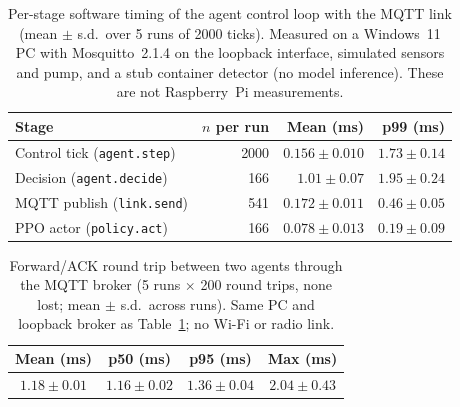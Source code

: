 \begin{table}[t]
\centering
\caption{Per-stage software timing of the agent control loop with the MQTT link
(mean $\pm$ s.d.\ over 5 runs of 2000 ticks). Measured on a Windows~11 PC with
Mosquitto~2.1.4 on the loopback interface, simulated sensors and pump, and a stub
container detector (no model inference). These are not Raspberry~Pi measurements.}
\label{tab:stage-timing-pc}
\begin{tabular}{lrrr}
\hline
Stage & $n$ per run & Mean (ms) & p99 (ms) \\
\hline
Control tick (\texttt{agent.step}) & 2000 & $0.156 \pm 0.010$ & $1.73 \pm 0.14$ \\
Decision (\texttt{agent.decide})   & 166  & $1.01 \pm 0.07$   & $1.95 \pm 0.24$ \\
MQTT publish (\texttt{link.send})  & 541  & $0.172 \pm 0.011$ & $0.46 \pm 0.05$ \\
PPO actor (\texttt{policy.act})    & 166  & $0.078 \pm 0.013$ & $0.19 \pm 0.09$ \\
\hline
\end{tabular}
\end{table}

\begin{table}[t]
\centering
\caption{Forward/ACK round trip between two agents through the MQTT broker
(5 runs $\times$ 200 round trips, none lost; mean $\pm$ s.d.\ across runs).
Same PC and loopback broker as Table~\ref{tab:stage-timing-pc}; no Wi-Fi or radio link.}
\label{tab:mqtt-rtt-pc}
\begin{tabular}{cccc}
\hline
Mean (ms) & p50 (ms) & p95 (ms) & Max (ms) \\
\hline
$1.18 \pm 0.01$ & $1.16 \pm 0.02$ & $1.36 \pm 0.04$ & $2.04 \pm 0.43$ \\
\hline
\end{tabular}
\end{table}
